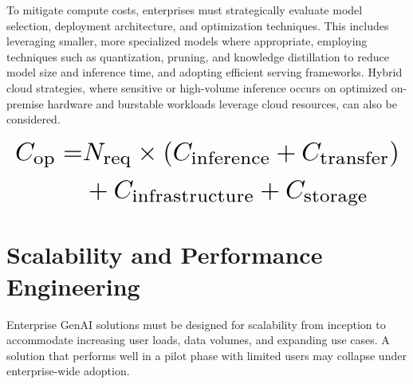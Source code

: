\documentclass[10pt,twocolumn,letterpaper]{article}
\begin{document}
To mitigate compute costs, enterprises must strategically evaluate model selection, deployment architecture, and optimization techniques. This includes leveraging smaller, more specialized models where appropriate, employing techniques such as quantization, pruning, and knowledge distillation to reduce model size and inference time, and adopting efficient serving frameworks. Hybrid cloud strategies, where sensitive or high-volume inference occurs on optimized on-premise hardware and burstable workloads leverage cloud resources, can also be considered.


























\begin{equation}
\resizebox{\columnwidth}{!}{$\displaystyle
\begin{aligned}
C_{\text{op}} = & N_{\text{req}} \times (C_{\text{inference}} + C_{\text{transfer}}) \\
& + C_{\text{infrastructure}} + C_{\text{storage}}
\end{aligned}
$}
\end{equation}




























\section{Scalability and Performance Engineering}


Enterprise GenAI solutions must be designed for scalability from inception to accommodate increasing user loads, data volumes, and expanding use cases. A solution that performs well in a pilot phase with limited users may collapse under enterprise-wide adoption.
\end{document}
